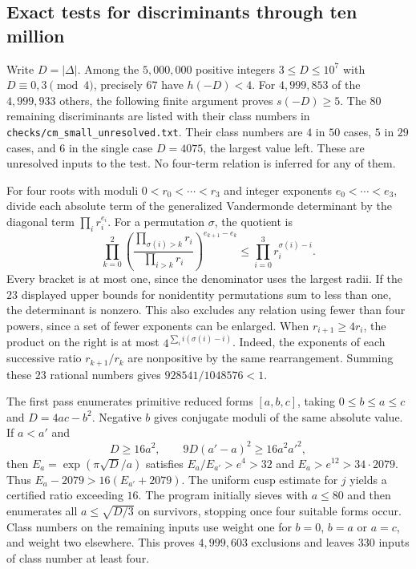 \subsection{Exact tests for discriminants through ten million}
\label{sec:cm-small}
Write $D=|\Delta|$. Among the $5{,}000{,}000$ positive
integers $3\le D\le10^7$ with $D\equiv0,3\pmod4$, precisely $67$ have
$h(-D)<4$. For $4{,}999{,}853$ of the $4{,}999{,}933$ others, the following
finite argument proves $s(-D)\ge5$. The $80$ remaining discriminants are
listed with their class numbers in \texttt{checks/cm\_small\_unresolved.txt}.
Their class numbers are $4$ in $50$ cases, $5$ in $29$ cases, and $6$ in the
single case $D=4075$, the largest value left. These are unresolved inputs to
the test. No four-term relation is inferred for any of them.

For four roots with moduli $0<r_0<\cdots<r_3$ and integer exponents
$e_0<\cdots<e_3$, divide each absolute term of the generalized Vandermonde
determinant by the diagonal term $\prod_i r_i^{e_i}$. For a permutation
$\sigma$, the quotient is
\[
 \prod_{k=0}^2
 \left(\frac{\prod_{\sigma(i)>k} r_i}{\prod_{i>k}r_i}\right)^{e_{k+1}-e_k}
 \le \prod_{i=0}^3r_i^{\sigma(i)-i}.
\]
Every bracket is at most one, since the denominator uses the largest radii.
If the $23$ displayed upper bounds for nonidentity permutations sum to less
than one, the determinant is nonzero. This also excludes any relation using
fewer than four powers, since a set of fewer exponents can be enlarged.
When $r_{i+1}\ge4r_i$, the product on the right is at most
$4^{\sum_i i(\sigma(i)-i)}$. Indeed, the exponents of each successive ratio
$r_{k+1}/r_k$ are nonpositive by the same rearrangement. Summing these $23$
rational numbers gives $928541/1048576<1$.

The first pass enumerates primitive reduced forms $[a,b,c]$, taking
$0\le b\le a\le c$ and $D=4ac-b^2$. Negative $b$ gives conjugate moduli
of the same absolute value. If $a<a'$ and
\[
 D\ge16a^2,\qquad 9D(a'-a)^2\ge16a^2a'^2,
\]
then $E_a=\exp(\pi\sqrt D/a)$ satisfies $E_a/E_{a'}>e^4>32$ and
$E_a>e^{12}>34\cdot2079$. Thus $E_a-2079>16(E_{a'}+2079)$.
The uniform cusp estimate for $j$ yields a certified ratio exceeding $16$.
The program initially sieves with $a\le80$ and then enumerates all
$a\le\sqrt{D/3}$ on survivors, stopping once four suitable forms occur.
Class numbers on the remaining inputs use weight one for $b=0$, $b=a$
or $a=c$, and weight two elsewhere. This proves $4{,}999{,}603$ exclusions
and leaves $330$ inputs of class number at least four.

